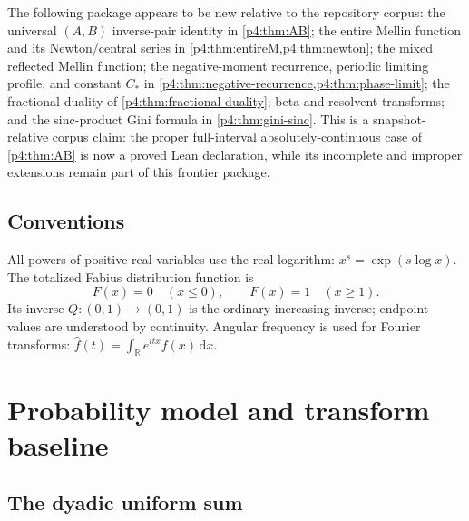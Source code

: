 \documentclass[11pt,oneside]{article}
\theoremstyle{definition}
\theoremstyle{remark}
\newcommand{\F}{F}
\newcommand{\Q}{Q}
\newcommand{\R}{\mathbb R}
\newcommand{\dd}{\,\mathrm d}
\newcommand{\1}{\mathbf 1}
\begin{document}
\begin{resultbox}
The following package appears to be new relative to the repository corpus: the universal
\((A,B)\) inverse-pair identity in \cref{p4:thm:AB}; the entire Mellin function and its
Newton/central series in \cref{p4:thm:entireM,p4:thm:newton}; the mixed reflected Mellin
function; the negative-moment recurrence, periodic limiting profile, and constant
\(C_*\) in \cref{p4:thm:negative-recurrence,p4:thm:phase-limit}; the fractional duality of
\cref{p4:thm:fractional-duality}; beta and resolvent transforms; and the sinc-product
Gini formula in \cref{p4:thm:gini-sinc}.
This is a snapshot-relative corpus claim: the proper full-interval absolutely-continuous
case of \cref{p4:thm:AB} is now a proved Lean declaration, while its incomplete and
improper extensions remain part of this frontier package.
\end{resultbox}

\subsection{Conventions}

All powers of positive real variables use the real logarithm:
\(x^s=\exp(s\log x)\).  The totalized Fabius distribution function is
\[
 \F(x)=0\quad(x\le0),\qquad \F(x)=1\quad(x\ge1).
\]
Its inverse \(\Q:(0,1)\to(0,1)\) is the ordinary increasing inverse; endpoint values
are understood by continuity.  Angular frequency is used for Fourier transforms:
\(\widehat f(t)=\int_\R e^{itx}f(x)\dd x\).

\section{Probability model and transform baseline}

\subsection{The dyadic uniform sum}
\end{document}
